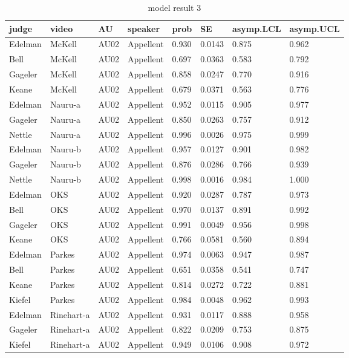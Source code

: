\documentclass{monashthesis}
\begin{document}
\begin{center}
\begin{longtable}{llllllll}
\caption{\label{tab:result_3} model result 3}\\
\toprule
judge & video & AU & speaker & prob & SE & asymp.LCL & asymp.UCL \\
\midrule
\endhead
\bottomrule
\endfoot
Edelman & McKell & AU02 & Appellent & 0.930 & 0.0143 & 0.875 & 0.962 \\
Bell & McKell & AU02 & Appellent & 0.697 & 0.0363 & 0.583 & 0.792 \\
Gageler & McKell & AU02 & Appellent & 0.858 & 0.0247 & 0.770 & 0.916 \\
Keane & McKell & AU02 & Appellent & 0.679 & 0.0371 & 0.563 & 0.776 \\
Edelman & Nauru-a & AU02 & Appellent & 0.952 & 0.0115 & 0.905 & 0.977 \\
Gageler & Nauru-a & AU02 & Appellent & 0.850 & 0.0263 & 0.757 & 0.912 \\
Nettle & Nauru-a & AU02 & Appellent & 0.996 & 0.0026 & 0.975 & 0.999 \\
Edelman & Nauru-b & AU02 & Appellent & 0.957 & 0.0127 & 0.901 & 0.982 \\
Gageler & Nauru-b & AU02 & Appellent & 0.876 & 0.0286 & 0.766 & 0.939 \\
Nettle & Nauru-b & AU02 & Appellent & 0.998 & 0.0016 & 0.984 & 1.000 \\
Edelman & OKS & AU02 & Appellent & 0.920 & 0.0287 & 0.787 & 0.973 \\
Bell & OKS & AU02 & Appellent & 0.970 & 0.0137 & 0.891 & 0.992 \\
Gageler & OKS & AU02 & Appellent & 0.991 & 0.0049 & 0.956 & 0.998 \\
Keane & OKS & AU02 & Appellent & 0.766 & 0.0581 & 0.560 & 0.894 \\
Edelman & Parkes & AU02 & Appellent & 0.974 & 0.0063 & 0.947 & 0.987 \\
Bell & Parkes & AU02 & Appellent & 0.651 & 0.0358 & 0.541 & 0.747 \\
Keane & Parkes & AU02 & Appellent & 0.814 & 0.0272 & 0.722 & 0.881 \\
Kiefel & Parkes & AU02 & Appellent & 0.984 & 0.0048 & 0.962 & 0.993 \\
Edelman & Rinehart-a & AU02 & Appellent & 0.931 & 0.0117 & 0.888 & 0.958 \\
Gageler & Rinehart-a & AU02 & Appellent & 0.822 & 0.0209 & 0.753 & 0.875 \\
Kiefel & Rinehart-a & AU02 & Appellent & 0.949 & 0.0106 & 0.908 & 0.972 \\

\end{longtable}
\end{center}
\end{document}
